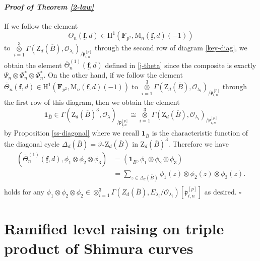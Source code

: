 \documentclass[10pt]{amsart}
\numberwithin{equation}{section}
\theoremstyle{plain}
\numberwithin{equation}{section}
\theoremstyle{definition}
\theoremstyle{remark}
\newenvironment{myproof}[2] {\paragraph{\emph{Proof of {#1} {#2} }}}{\hfill$\square$}
\def\triplef{\underline{\mathbf{f}}}
\def\threetensor{\overset{3}{\underset{i=1}\otimes}}
\def\calO{\mathcal{O}}
\def\frakp{\mathfrak{p}}
\def\FF{\mathbf{F}}
\def\rmH{\mathrm{H}}
\def\rmM{\mathrm{M}}
\def\rmZ{\mathrm{Z}}
\begin{document}
\begin{myproof}{Theorem \ref{2-law}}{}
If we follow the element 
\begin{equation*}
\overline{\Theta}_{n}(\triplef, d)\in\rmH^{1}(\FF_{p^{2}}, \rmM_{n}(\triplef, d)(-1)) 
\end{equation*}
to $\threetensor\Gamma(\rmZ_{d}(\overline{B}), \calO_{\lambda_{i}})_{/\frakp^{[p]}_{i, n}}$ through the second row of diagram \ref{key-diag}, we obtain  the element $\overline{\Theta}^{(1)}_{n}(\triplef, d)$ defined in \ref{j-theta} since the composite is exactly $\Psi_{n}\otimes\Phi^{\ast}_{n}\otimes\Phi^{\ast}_{n}$. On the other hand, if we follow the element $\overline{\Theta}_{n}(\triplef, d)\in\rmH^{1}(\FF_{p^{2}}, \rmM_{n}(\triplef, d)(-1))$ to $\threetensor\Gamma(\rmZ_{d}(\overline{B}), \calO_{\lambda_{i}})_{/\frakp^{[p]}_{i, n}}$ through the first row of this diagram, then we obtain the element  
\begin{equation*}
\mathbf{1}_{\overline{B}}\in \Gamma(\rmZ_{d}(\overline{B})^{3}, \calO_{\lambda})_{/\frakp^{[p]}_{\triplef,n}}\cong\threetensor\Gamma(\rmZ_{d}(\overline{B}), \calO_{\lambda_{i}})_{/\frakp^{[p]}_{i, n}} 
\end{equation*}
by Proposition \ref{ss-diagonal} where we recall $\mathbf{1}_{\overline{B}}$ is the characteristic function of the diagonal cycle $\Delta_{d}(\overline{B})=\vartheta_{\ast}\rmZ_{d}(\overline{B})$ in $\rmZ_{d}(\overline{B})^{3}$. Therefore we have
\begin{equation*}
\begin{aligned}
(\bar{\Theta}^{(1)}_{n}(\triplef, d), \phi_{1}\otimes\phi_{2}\otimes\phi_{3})&=(\mathbf{1}_{\overline{B}}, \phi_{1}\otimes\phi_{2}\otimes\phi_{3})\\
&=\sum_{z\in \Delta_{d}(\overline{B})} \phi_{1}(z)\otimes \phi_{2}(z)\otimes \phi_{3}(z).\\
\end{aligned}
\end{equation*} 
holds for any $\phi_{1}\otimes \phi_{2}\otimes \phi_{2}\in \otimes^{3}_{i=1}\Gamma(Z_{d}(\overline{B}),E_{\lambda_{i}}/ \calO_{\lambda_{i}})[\frakp^{[p]}_{i, n}]$ as desired.
\end{myproof}


\section{Ramified level raising on triple product of Shimura curves}
\end{document}
